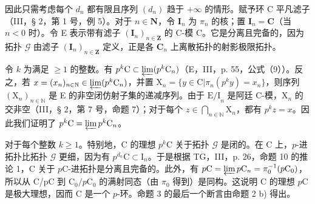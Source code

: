 因此只需考虑每个 \(d_{n}\) 都有限且序列 \((d_{n})\) 趋于 \(+\infty\) 的情形。赋予环 C 平凡滤子（III，§ 2，第 1 号，例 5）。对于 \(n\in\mathbf{N}\)，令 \(\mathbf{I}_{n}\) 为 \(\pi_{n}\) 的核；置 \(\mathbf{I}_{n}=\mathbf{C}\)（当 \(n<0\) 时）。令 E 表示带有滤子 \((\mathbf{I}_{n})_{n\in\mathbf{Z}}\) 的 C-模 C。它是分离且完备的，因为拓扑 \(\mathcal{G}\) 由滤子 \((\mathbf{I}_{n})_{n\in\mathbf{Z}}\) 定义，正是各 \(\mathbf{C}_{n}\) 上离散拓扑的射影极限拓扑。

令 \(k\) 为满足 \(\geqslant 1\) 的整数。有 \(p^{k}\mathrm{C} \subset \varprojlim (p^{k}\mathrm{C}_{n})\)（E，III，p. 55，公式（9））。反之，若 \(x = (x_{n})_{n \in \mathbb{N}} \in \varprojlim (p^{k}\mathrm{C}_{n})\)，并置 \(\mathrm{X}_{n} = \{y \in \mathrm{C}|\pi_{n}(p^{k}y) = x_{n}\}\)，则序列 \((\mathrm{X}_{n})_{n \in \mathbb{N}}\) 是 E 的非空闭仿射子集的递减序列。由于 \(\mathrm{E / I}_{n}\) 是阿廷 C-模，\(\mathrm{X}_{n}\) 的交非空（III，§ 2，第 7 号，命题 7）；对于每个 \(z \in \bigcap_{n \in \mathbb{N}} \mathrm{X}_{n}\)，都有 \(p^{k}z = x\)。因此我们证明了 \(p^{k}\mathrm{C} = \varprojlim p^{k}\mathrm{C}_{n}\)。

对于每个整数 \(k \geqslant 1\)。特别地，C 的理想 \(p^{k}\text{C}\) 关于拓扑 \(\mathcal{G}\) 是闭的。在 C 上，\(p\)-进拓扑比拓扑 \(\mathcal{G}\) 更细，因为有 \(p^{d_{n}}\text{C} \subset \text{I}_{n}\)。于是根据 TG，III，p. 26，命题 10 的推论 1，C 关于 \(p\text{C}\)-进拓扑是分离且完备的。此外，有 \(p\text{C} = \varprojlim p\text{C}_{n} = \pi_{0}^{-1}(p\text{C}_{0})\)，所以从 C/pC 到 \(\text{C}_{0}/p\text{C}_{0}\) 的满射同态（由 \(\pi_{0}\) 得到）是同构。这说明 C 的理想 \(p\text{C}\) 是极大理想，因而 C 是一个 \(p\)-环。命题 3 的最后一个断言由命题 2 b) 得出。

